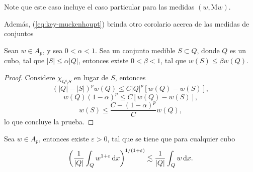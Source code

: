 \begin{remark}
	Note que este caso incluye el caso particular para las medidas $(w,\mathrm{M}w)$.
\end{remark}
Además, (\ref{eq:key-muckenhoupt}) brinda otro corolario acerca de las medidas de conjuntos
\begin{corollary}
	Sean $w\in A_p$, y sea $0<\alpha<1$. Sea un conjunto medible $S\subset Q$, donde $Q$ es un cubo, tal que $|S|\leq \alpha|Q|$, entonces existe $0<\beta<1$, tal que $w(S)\leq \beta w(Q)$.
\end{corollary}
\begin{proof}
	Considere $\chi_{Q\setminus S}$ en lugar de $S$, entonces
	\begin{equation*}
		(|Q|-|S|)^p w(Q) \leq C |Q|^p [w(Q) - w(S)],
	\end{equation*}
	\begin{equation*}
		w(Q)(1-\alpha)^p \leq C [w(Q) - w(S)],
	\end{equation*}
	\begin{equation*}
		w(S) \leq \frac{C-(1-\alpha)^p}{C}w(Q), 
	\end{equation*}
	lo que concluye la prueba.
\end{proof}
\begin{theorem}
	Sea $w\in A_p$, entonces existe $\varepsilon>0$, tal que se tiene que para cualquier cubo 
	\begin{equation*}
		\left(\frac{1}{|Q|}\int_Q w^{1+\varepsilon}\mathop{}\!\mathrm{d} x \right)^{1/(1+\varepsilon)} \lesssim \frac{1}{|Q|} \int_Q w\mathop{}\!\mathrm{d} x.
	\end{equation*}
\end{theorem}
